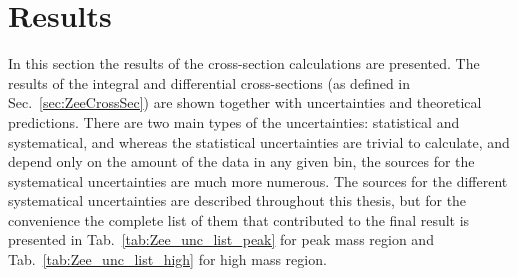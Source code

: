 \chapter{Results}
\label{sec:Results}

In this section the results of the cross-section calculations are presented. The results of the integral and differential cross-sections (as defined in Sec.~\ref{sec:ZeeCrossSec}) are shown together with uncertainties and theoretical predictions. There are two main types of the uncertainties: statistical and systematical, and whereas the statistical uncertainties are trivial to calculate, and depend only on the amount of the data in any given bin, the sources for the systematical uncertainties are much more numerous. The sources for the different systematical uncertainties are described throughout this thesis, but for the convenience the complete list of them that contributed to the final result is presented in Tab.~\ref{tab:Zee_unc_list_peak} for peak mass region and Tab.~\ref{tab:Zee_unc_list_high} for high mass region.

